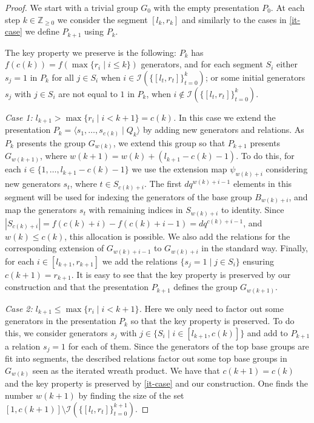 \documentclass[12pt,a4paper]{amsart}
\begin{document}
\begin{proof}

\smallskip

We start with a trivial group $G_0$ with the empty presentation $P_0$. At each step $k\in \mathbb Z_{\geq 0}$ we consider the segment $[l_k,r_k]$ and similarly to the cases in \eqref{it-case} we define $P_{k+1}$ using $P_k$. 

The key property we preserve is the following: $P_k$ has $f(c(k))=f(\max \{r_i \mid i\leq k\})$ generators, and for each segment $S_i$ either $s_j=1$ in $P_k$ for all $j\in S_i$ when $i\in \mathcal I(\{[l_t,r_t]\}_{t=0}^k)$; or some initial generators $s_j$ with $j\in S_i$ are not equal to $1$ in $P_k$, when $i\notin \mathcal I(\{[l_t,r_t]\}_{t=0}^k)$. 

\emph{Case 1: $l_{k+1}>\max \{r_i \mid i<k+1\}=c(k)$.} In this case we extend the presentation $P_k=\langle s_1,\ldots,s_{c(k)} \mid Q_k \rangle$ by adding new generators and relations. As $P_k$ presents the group $G_{w(k)}$, we extend this group so that $P_{k+1}$ presents $G_{w(k+1)}$, where $w(k+1)=w(k)+(l_{k+1}-c(k)-1)$. To do this, for each $i\in \{1,\ldots,l_{k+1}-c(k)-1\}$ we use the extension map $\psi_{w(k)+i}$ considering new generators $s_t$, where $t\in S_{c(k)+i}$. The first $dq^{w(k)+i-1}$ elements in this segment will be used for indexing the generators of the base group $B_{w(k)+i}$, and map the generators $s_t$ with remaining indices in $S_{w(k)+i}$ to identity. Since $|S_{c(k)+i}|=f(c(k)+i)-f(c(k)+i-1)=dq^{c(k)+i-1}$, and $w(k)\leq c(k)$, this allocation is possible. We also add the relations for the corresponding extension of $G_{w(k)+i-1}$ to $G_{w(k)+i}$ in the standard way. Finally, for each $i\in [l_{k+1},r_{k+1}]$ we add the relations $\{ s_j=1 \mid j \in  S_{i} \}$ ensuring  $c(k+1)=r_{k+1}$. It is easy to see that the key property is preserved by our construction and that the presentation $P_{k+1}$ defines the group $G_{w(k+1)}$.

\emph{Case 2: $l_{k+1}\leq\max \{r_i \mid i<k+1\}$.} Here we only need to factor out some generators in the presentation $P_k$ so that the key property is preserved. To do this, we consider generators $s_j$ with $j\in \{S_i \mid i\in [l_{k+1},c(k)]\}$ and add to $P_{k+1}$ a relation $s_j=1$ for each of them. Since the generators of the top base groups are fit into segments, the described relations factor out some top base groups in $G_{w(k)}$ seen as the iterated wreath product. We have that $c(k+1)=c(k)$ and the key property is preserved by \eqref{it-case} and our construction. One finds the number $w(k+1)$ by finding the size of the set $[1,c(k+1)]\setminus \mathcal I(\{[l_t,r_t]\}_{t=0}^{k+1})$.


\end{proof}
\end{document}
